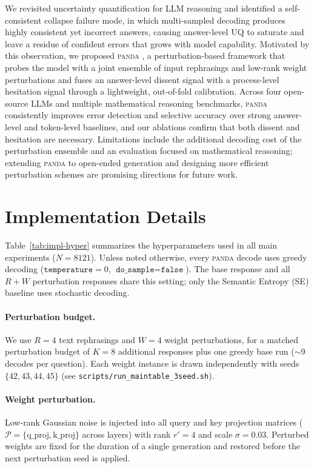 \documentclass{article} %
\DeclareRobustCommand{\method}{%
  \texorpdfstring{%
    \ifmmode\text{\normalfont\textsc{panda}}\else\textsc{panda}\xspace\fi
  }{PANDA}%
}
\begin{document}
We revisited uncertainty quantification for LLM reasoning and identified a self-consistent collapse failure mode, in which multi-sampled decoding produces highly consistent yet incorrect answers, causing answer-level UQ to saturate and leave a residue of confident errors that grows with model capability. Motivated by this observation, we proposed \method{}, a perturbation-based framework that probes the model with a joint ensemble of input rephrasings and low-rank weight perturbations and fuses an answer-level dissent signal with a process-level hesitation signal through a lightweight, out-of-fold calibration. Across four open-source LLMs and multiple mathematical reasoning benchmarks, \method{} consistently improves error detection and selective accuracy over strong answer-level and token-level baselines, and our ablations confirm that both dissent and hesitation are necessary. Limitations include the additional decoding cost of the perturbation ensemble and an evaluation focused on mathematical reasoning; extending \method{} to open-ended generation and designing more efficient perturbation schemes are promising directions for future work.

\newpage

\appendix

\section{Implementation Details}
\label{app:impl}

Table~\ref{tab:impl-hyper} summarizes the hyperparameters used in all main experiments ($N{=}8121$).
Unless noted otherwise, every \method{} decode uses greedy decoding
($\texttt{temperature}{=}0$, $\texttt{do\_sample}{=}\texttt{false}$).
The base response and all $R{+}W$ perturbation responses share this setting; only the Semantic Entropy (SE) baseline uses stochastic decoding.

\paragraph{Perturbation budget.}
We use $R{=}4$ text rephrasings and $W{=}4$ weight perturbations, for a matched perturbation budget of $K{=}8$ additional responses plus one greedy base run ($\sim$9 decodes per question).
Each weight instance is drawn independently with seeds $\{42,43,44,45\}$ (see \texttt{scripts/run\_maintable\_3seed.sh}).

\paragraph{Weight perturbation.}
Low-rank Gaussian noise is injected into all query and key projection matrices ($\mathcal{P}=\{\mathrm{q\_proj},\mathrm{k\_proj}\}$ across layers) with rank $r'{=}4$ and scale $\sigma{=}0.03$.
Perturbed weights are fixed for the duration of a single generation and restored before the next perturbation seed is applied.
\end{document}
